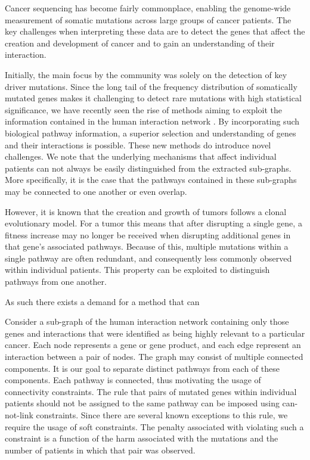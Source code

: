 \documentclass[conference,compsoc]{IEEEtran}
\begin{document}
Cancer sequencing has become fairly commonplace, enabling the genome-wide measurement of somatic mutations across large groups of cancer patients.
The key challenges when interpreting these data are to detect the genes that affect the creation and development of cancer and to gain an understanding of their interaction.

Initially, the main focus by the community was solely on the detection of key driver mutations. Since the long tail of the frequency distribution of somatically mutated genes makes it challenging to detect rare mutations with high statistical significance, we have recently seen the rise of methods aiming to exploit the information contained in the human interaction network \cite{some_methods}. By incorporating such biological pathway information, a superior selection and understanding of genes and their interactions is possible. These new methods do introduce novel challenges. We note that the underlying mechanisms that affect individual patients can not always be easily distinguished from the extracted sub-graphs. More specifically, it is the case that the pathways contained in these sub-graphs may be connected to one another or even overlap.

However, it is known that the creation and growth of tumors follows a clonal evolutionary model. For a tumor this means that after disrupting a single gene, a fitness increase may no longer be received when disrupting additional genes in that gene's associated pathways. Because of this, multiple mutations within a single pathway are often redundant, and consequently less commonly observed within individual patients. This property can be exploited to distinguish pathways from one another.

As such there exists a demand for a method that can 

Consider a sub-graph of the human interaction network containing only those genes and interactions that were identified as being highly relevant to a particular cancer. Each node represents a gene or gene product, and each edge represent an interaction between a pair of nodes. The graph may consist of multiple connected components. It is our goal to separate distinct pathways from each of these components. Each pathway is connected, thus motivating the usage of connectivity constraints. The rule that pairs of mutated genes within individual patients should not be assigned to the same pathway can be imposed using can-not-link constraints. Since there are several known exceptions to this rule, we require the usage of soft constraints. The penalty associated with violating such a constraint is a function of the harm associated with the mutations and the number of patients in which that pair was observed.
\end{document}
